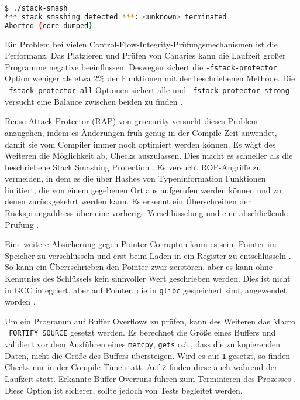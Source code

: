 \begin{lstlisting}[language=bash]
$ ./stack-smash
*** stack smashing detected ***: <unknown> terminated
Aborted (core dumped)
\end{lstlisting}

Ein Problem bei vielen Control-Flow-Integrity-Prüfungsmechanismen ist die Performanz. Das Platzieren und Prüfen von Canaries kann die Laufzeit großer Programme negative beeinflussen. 
Deswegen sichert die \texttt{-fstack-protector} Option weniger als etwa 2\% der Funktionen mit der beschriebenen Methode. Die \texttt{-fstack-protector-all} Optionen sichert alle und \texttt{-fstack-protector-strong} versucht eine Balance zwischen beiden zu finden \cite{stack-protector-strong}.

Reuse Attack Protector (RAP) von grsecurity versucht dieses Problem anzugehen, indem es Änderungen früh genug in der Compile-Zeit anwendet, damit sie vom Compiler immer noch optimiert werden können. Es wägt des Weiteren die Möglichkeit ab, Checks auszulassen. Dies macht es schneller als die beschriebene Stack Smashing Protection \cite{grsec-rap}. Es versucht ROP-Angriffe zu vermeiden, in dem es die über Hashes von Typeninformation Funktionen limitiert, die von einem gegebenen Ort aus aufgerufen werden können und zu denen zurückgekehrt werden kann. Es erkennt ein Überschreiben
der Rücksprungaddress über eine vorherige Verschlüsselung und eine abschließende Prüfung \cite{grsec-rap-faq}.

Eine weitere Absicherung gegen Pointer Corrupton kann es sein, Pointer im Speicher zu verschlüsseln und erst beim Laden in ein Register zu entschlüsseln \cite{pointguard}. So kann ein Überrschrieben den Pointer zwar zerstören, aber es kann ohne Kenntniss des Schlüssels kein sinnvoller Wert geschrieben werden. Dies ist nicht in GCC integriert, aber auf Pointer, die in \texttt{glibc} gespeichert sind, angewendet worden \cite{ubuntu-security-features}.

Um ein Programm auf Buffer Overflows zu prüfen, kann des Weiteren das Macro \texttt{\_FORTIFY\_SOURCE} gesetzt werden. Es berechnet die Größe eines Buffers und validiert vor dem Ausführen eines \texttt{memcpy}, \texttt{gets} o.ä., dass die zu kopierenden Daten, nicht die Größe des Buffers übersteigen.
Wird es auf \texttt{1} gesetzt, so finden Checks nur in der Compile Time statt. Auf \texttt{2} finden diese auch während der Laufzeit statt. Erkannte Buffer Overruns führen zum Terminieren des Prozesses \cite{man-fortify}. Diese Option ist sicherer, sollte jedoch von Tests begleitet werden. 


